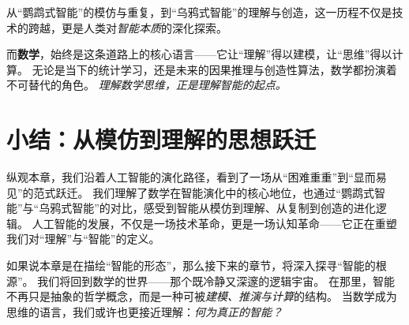 从“鹦鹉式智能”的模仿与重复，到“乌鸦式智能”的理解与创造，这一历程不仅是技术的跨越，更是人类对\emph{智能本质}的深化探索。  

而\textbf{数学}，始终是这条道路上的核心语言——它让“理解”得以建模，让“思维”得以计算。  
无论是当下的统计学习，还是未来的因果推理与创造性算法，数学都扮演着不可替代的角色。  
\emph{理解数学思维，正是理解智能的起点。}  

\section{小结：从模仿到理解的思想跃迁}

纵观本章，我们沿着人工智能的演化路径，看到了一场从“困难重重”到“显而易见”的范式跃迁。  
我们理解了数学在智能演化中的核心地位，也通过“鹦鹉式智能”与“乌鸦式智能”的对比，感受到智能从模仿到理解、从复制到创造的进化逻辑。  
人工智能的发展，不仅是一场技术革命，更是一场认知革命——它正在重塑我们对“理解”与“智能”的定义。  

如果说本章是在描绘“智能的形态”，那么接下来的章节，将深入探寻“智能的根源”。  
我们将回到数学的世界——那个既冷静又深邃的逻辑宇宙。  
在那里，智能不再只是抽象的哲学概念，而是一种可被\emph{建模、推演与计算}的结构。  
当数学成为思维的语言，我们或许也更接近理解：\emph{何为真正的智能？}  

\nocite{*}
\newpage